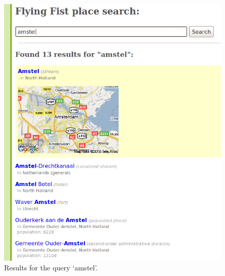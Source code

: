 \documentclass[a4paper,12pt]{article}
\begin{document}
\begin{figure}[h]
  \includegraphics[width=\linewidth]{img/search.png}
  \caption{Results for the query `amstel'.}
  \label{search}
\end{figure}
\end{document}
